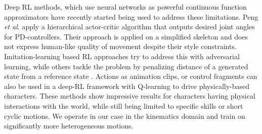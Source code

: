 \documentclass[acmtog]{acmart}
\newcommand{\etal}{\textit{et al}. }
\begin{document}
Deep RL methods, which use neural networks as powerful continuous function approximators have recently started being used to address these limitations. Peng \etal {} apply a hierarchical actor-critic algorithm that outputs desired joint angles for PD-controllers. Their approach is applied on a simplified skeleton and does not express human-like quality of movement despite their style constraints. Imitation-learning based RL approaches \cite{ho2016generative, baram2016model} try to address this with adversarial learning, while others tackle the problem by penalizing distance of a generated state from a reference state \cite{peng2018deepmimic, bergamin2019drecon}. Actions as animation clips, or control fragments \cite{liu2017learning} can also be used in a deep-RL framework with Q-learning to drive physically-based characters. These methods show impressive results for characters having physical interactions with the world, while still being limited to specific skills or short cyclic motions. We operate in our case in the kinematics domain and train on significantly more heterogeneous motions. 
\end{document}
